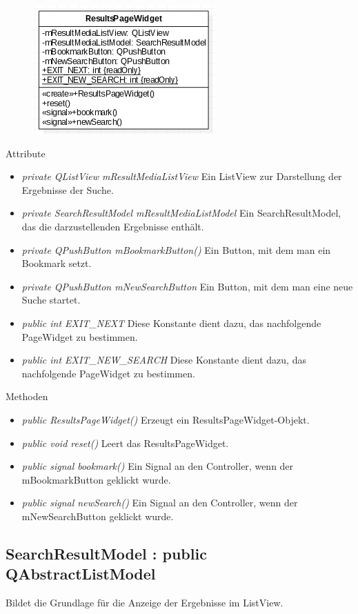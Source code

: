 \begin{figure}[H]
	\centering
	\includegraphics[scale=0.5]{img/Klassendiagramm/Klassen/View/ResultsPageWidget}
	\label{fig:resultsPageWidget}
\end{figure}
\pagebreak
Attribute
\begin{itemize}
	\item\textit{private QListView mResultMediaListView}
	Ein ListView zur Darstellung der Ergebnisse der Suche.
	\item\textit{private SearchResultModel mResultMediaListModel}
	Ein SearchResultModel, das die darzustellenden Ergebnisse enthält.
	\item\textit{private QPushButton mBookmarkButton()}
	Ein Button, mit dem man ein Bookmark setzt.
	\item\textit{private QPushButton mNewSearchButton}
	Ein Button, mit dem man eine neue Suche startet.
	\item\textit{public int EXIT\_NEXT}  
	Diese Konstante dient dazu, das nachfolgende PageWidget zu bestimmen.
	\item\textit{public int EXIT\_NEW\_SEARCH}
	Diese Konstante dient dazu, das nachfolgende PageWidget zu bestimmen.  
\end{itemize}

Methoden
\begin{itemize}
	\item\textit{public ResultsPageWidget()}
	Erzeugt ein ResultsPageWidget-Objekt.
	\item\textit{public void reset()}
	Leert das ResultsPageWidget.
	\item\textit{public signal bookmark()}
	Ein Signal an den Controller, wenn der mBookmarkButton geklickt wurde.
	\item\textit{public signal newSearch()}
	Ein Signal an den Controller, wenn der mNewSearchButton geklickt wurde.
\end{itemize}

\subsection*{SearchResultModel : public QAbstractListModel}
Bildet die Grundlage für die Anzeige der Ergebnisse im ListView.

